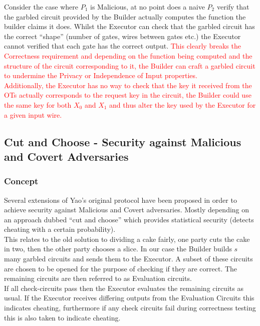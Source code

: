 \documentclass[ %
                    author={Nicholas Tutte},
                supervisor={Prof. Nigel Smart},
                    degree={MEng},
                     title={Secure Two Party Computation},
                  subtitle={A practical comparison of recent protocols},
                      type={Research - GG1K},
                      year={2015} ]{dissertation}
\begin{document}
			Consider the case where $P_1$ is Malicious, at no point does a naive $P_2$ verify that the garbled circuit provided by the Builder actually computes the function the builder claims it does. Whilst the Executor can check that the garbled circuit has the correct ``shape'' (number of gates, wires between gates etc.) the Executor cannot verified that each gate has the correct output. \textcolor{red}{This clearly breaks the Correctness requirement and depending on the function being computed and the structure of the circuit corresponding to it, the Builder can craft a garbled circuit to undermine the Privacy or Independence of Input properties.}\\

			\textcolor{red}{Additionally, the Executor has no way to check that the key it received from the OTs actually corresponds to the request key in the circuit, the Builder could use the same key for both $X_0$ and $X_1$ and thus alter the key used by the Executor for a given input wire.}


		\subsection{Cut and Choose - Security against Malicious and Covert Adversaries} \label{sub:YaoMalicious}
			\subsubsection{Concept}
				Several extensions of Yao's original protocol have been proposed in order to achieve security against Malicious and Covert adversaries. Mostly depending on an approach dubbed ``cut and choose'' which provides statistical security (detects cheating with a certain probability).\\

				This relates to the old solution to dividing a cake fairly, one party cuts the cake in two, then the other party chooses a slice. In our case the Builder builds $s$ many garbled circuits and sends them to the Executor. A subset of these circuits are chosen to be opened for the purpose of checking if they are correct. The remaining circuits are then referred to as Evaluation circuits.\\

				If all check-circuits pass then the Executor evaluates the remaining circuits as usual. If the Executor receives differing outputs from the Evaluation Circuits this indicates cheating, furthermore if any check circuits fail during correctness testing this is also taken to indicate cheating.\\
\end{document}
